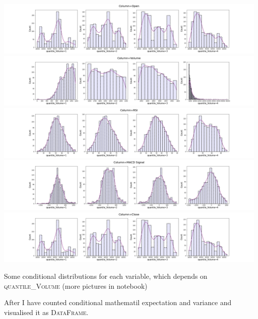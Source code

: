 \documentclass[%
12pt, %
final, %
oneside, %
onecolumn, %
centertags]{article} %
\theoremstyle{plain}
\theoremstyle{definition}
\theoremstyle{remark}
\begin{document}
\begin{center}
\includegraphics[scale=0.3]{images/conditional_distr_column_Open.png}
\includegraphics[scale=0.3]{images/conditional_distr_column_Volume.png}
\includegraphics[scale=0.3]{images/conditional_distr_column_RSI.png}
\includegraphics[scale=0.3]{images/conditional_distr_column_MACD Signal.png}
\includegraphics[scale=0.3]{images/conditional_distr_column_Close.png}

Some conditional distributions for each variable, which depends on \textsc{quantile\_Volume} (more pictures in notebook)
\end{center}

After I have counted conditional mathematil expectation and variance and visualised it as \textsc{DataFrame}.
\end{document}
